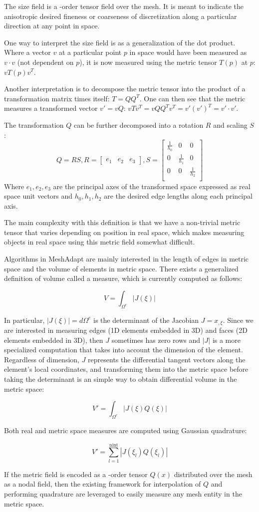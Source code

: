 \documentclass{article}
\begin{document}
The size field is a -order tensor field over the mesh.
It is meant to indicate the anisotropic desired fineness or
coarseness of discretization along a particular direction
at any point in space.

One way to interpret the size field is as a generalization of the dot product.
Where a vector $v$ at a particular point $p$ in space would have
been measured as $v\cdot v$ (not dependent on $p$), it is now
measured using the metric tensor $T(p)$ at $p$: $vT(p)v^T$.

Another interpretation is to decompose the metric tensor into
the product of a transformation matrix times itself: $T=QQ^T$.
One can then see that the metric measures a transformed vector
$v'=vQ$: $vTv^T=vQQ^Tv^T=v'(v')^T=v'\cdot v'$.

The transformation $Q$ can be further decomposed into a rotation $R$
and scaling $S$:
\[Q=RS,
R=\begin{bmatrix}
e_1 & e_2 & e_3
\end{bmatrix},
S=\begin{bmatrix}
\frac{1}{h_0} & 0 & 0 \\
0 & \frac{1}{h_1} & 0 \\
0 & 0 & \frac{1}{h_2} \\
\end{bmatrix}\]
Where $e_1,e_2,e_3$ are the principal axes of the transformed
space expressed as real space unit vectors and
$h_0,h_1,h_2$ are the desired edge lengths along each
principal axis.

The main complexity with this definition is that we have a non-trivial
metric tensor that varies depending on position in real space, which
makes measuring objects in real space using this metric field somewhat
difficult.

Algorithms in MeshAdapt are mainly interested in the length of edges
in metric space and the volume of elements in metric space.
There exists a generalized definition of volume called a measure,
which is currently computed as follows:

\[V=\int_{\Omega^e} |J(\xi)|\]

In particular, $|J(\xi)|=d\Omega^e$ is the determinant of the Jacobian $J=x_{,\xi}$.
Since we are interested in measuring edges (1D elements embedded in 3D)
and faces (2D elements embedded in 3D), then $J$ sometimes has zero rows
and $|J|$ is a more specialized computation that takes into account
the dimension of the element.
Regardless of dimension, $J$ represents the differential tangent vectors
along the element's local coordinates, and transforming them into the
metric space before taking the determinant is an simple way to obtain
differential volume in the metric space:

\[V'=\int_{\Omega^e} |J(\xi)Q(\xi)|\]

Both real and metric space measures are computed using Gaussian quadrature:

\[V'=\sum_{l=1}^{\text{nint}} |J(\xi_l)Q(\xi_l)|\]

If the metric field is encoded as a -order tensor $Q(x)$ distributed
over the mesh as a nodal field, then the existing framework for interpolation
of $Q$ and performing quadrature are leveraged to easily measure any
mesh entity in the metric space.
\end{document}
